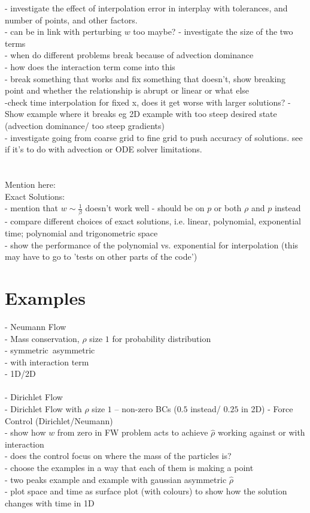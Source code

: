 \documentclass[11pt, a4paper]{article}
\theoremstyle{definition}
\begin{document}
- investigate the effect of interpolation error in interplay with tolerances, and number of points, and other factors.\\
- can be in link with perturbing $w$ too maybe?
- investigate the size of the two terms \\
- when do different problems break because of advection dominance\\
- how does the interaction term come into this\\
- break something that works and fix something that doesn't, show breaking point and whether the relationship is abrupt or linear or what else\\
-check time interpolation for fixed x, does it get worse with larger solutions?
- Show example where it breaks eg 2D example with too steep desired state (advection dominance/ too steep gradients)\\
- investigate going from coarse grid to fine grid to push accuracy of solutions. see if it's to do with advection or ODE solver limitations.\\
\\
\\
Mention here:\\
Exact Solutions:\\
- mention that $w \sim \frac{1}{\beta}$ doesn't work well - should be on $p$ or both $\rho$ and $p$ instead \\
- compare different choices of exact solutions, i.e. linear, polynomial, exponential time; polynomial and trigonometric space \\
- show the performance of the polynomial vs. exponential for interpolation (this may have to go to 'tests on other parts of the code') \\
\section{Examples}
- Neumann Flow\\
- Mass conservation, $\rho$ size $1$ for probability distribution\\
- symmetric\ asymmetric\\
- with interaction term \\
- 1D/2D \\
\\
- Dirichlet Flow \\
- Dirichlet Flow with $\rho$ size $1$ -- non-zero BCs ($0.5$ instead/ $0.25$ in 2D)
- Force Control (Dirichlet/Neumann) \\
- show how $w$ from zero in FW problem acts to achieve $\hat \rho$ working against or with interaction\\
- does the control focus on where the mass of the particles is?\\
- choose the examples in a way that each of them is making a point\\
- two peaks example and example with gaussian asymmetric $\hat \rho$\\
- plot space and time as surface plot (with colours) to show how the solution changes with time in 1D\\
\end{document}

